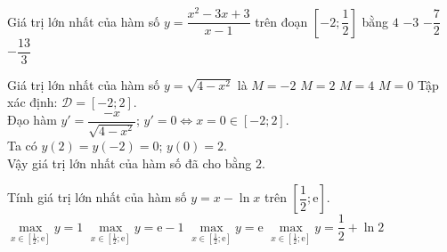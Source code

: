 \begin{ex}%
	Giá trị lớn nhất của hàm số $y=\dfrac{x^2-3x+3}{x-1}$ trên đoạn $\left[-2;\dfrac{1}{2}\right]$ bằng
	\choice
	{$4$}
	{\True $-3$}
	{$-\dfrac{7}{2}$}
	{$-\dfrac{13}{3}$}
\end{ex} 

\begin{ex}
	Giá trị lớn nhất của hàm số $y=\sqrt{4-x^2}$ là
	\choice
	{$M=-2$}
	{\True $M=2$ }
	{$M=4$}
	{$M=0$}
	\loigiai
	{
		Tập xác định: $\mathscr{D}=\left[-2;2\right]$.\\
		Đạo hàm $y'=\dfrac{-x}{\sqrt{4-x^{2}}}$; $y'=0 \Leftrightarrow x=0 \in \left[-2;2\right]$.\\
		Ta có $y(2)=y(-2)=0$; $y(0)=2$.\\
		Vậy giá trị lớn nhất của hàm số đã cho bằng $2$.
	}
\end{ex} 

\begin{ex}%
	Tính giá trị lớn nhất của hàm số $y=x-\ln x$ trên $\left[\dfrac{1}{2};\mathrm{e}\right]$.\\
	\choice
	{$\max\limits_{x \in \left[\frac{1}{2};\mathrm{e}\right]}y=1$}
	{\True $\max\limits_{x \in \left[\frac{1}{2};\mathrm{e}\right]}y=\mathrm{e}-1$}
	{$\max\limits_{x \in \left[\frac{1}{2};\mathrm{e}\right]}y=\mathrm{e}$}
	{$\max\limits_{x \in \left[\frac{1}{2};\mathrm{e}\right]}y=\dfrac{1}{2}+\ln 2$}
\end{ex} 

